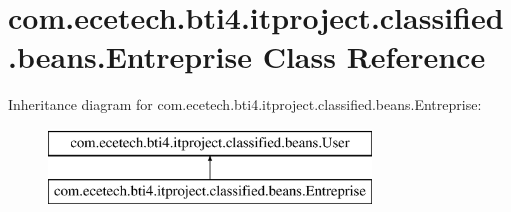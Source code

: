 \hypertarget{classcom_1_1ecetech_1_1bti4_1_1itproject_1_1classified_1_1beans_1_1_entreprise}{}\section{com.\+ecetech.\+bti4.\+itproject.\+classified.\+beans.\+Entreprise Class Reference}
\label{classcom_1_1ecetech_1_1bti4_1_1itproject_1_1classified_1_1beans_1_1_entreprise}
Inheritance diagram for com.\+ecetech.\+bti4.\+itproject.\+classified.\+beans.\+Entreprise\+:\begin{figure}[H]
\begin{center}
\leavevmode
\includegraphics[height=2.000000cm]{classcom_1_1ecetech_1_1bti4_1_1itproject_1_1classified_1_1beans_1_1_entreprise}
\end{center}
\end{figure}
